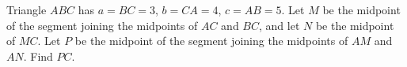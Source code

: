 Triangle $ABC$ has $a=BC=3$, $b=CA=4$, $c=AB=5$. Let $M$ be the midpoint of the segment joining the midpoints of $AC$ and $BC$, and let $N$ be the midpoint of $MC$. Let $P$ be the midpoint of the segment joining the midpoints of $AM$ and $AN$. Find $PC$.
